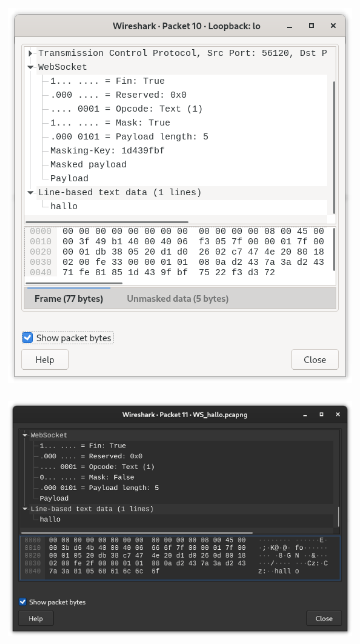 \documentclass{article}
\begin{document}
\begin{figure}[h]
    \centering
    \begin{subfigure}{.48\linewidth}
        \includegraphics[width=\linewidth]{illustrasjoner/WS_fra_klient.png}
    \end{subfigure}
    \hfill
    \begin{subfigure}{.48\linewidth}
        \includegraphics[width=\linewidth]{illustrasjoner/WS_fra_tjener.png}
    \end{subfigure}
\end{figure}
\end{document}
